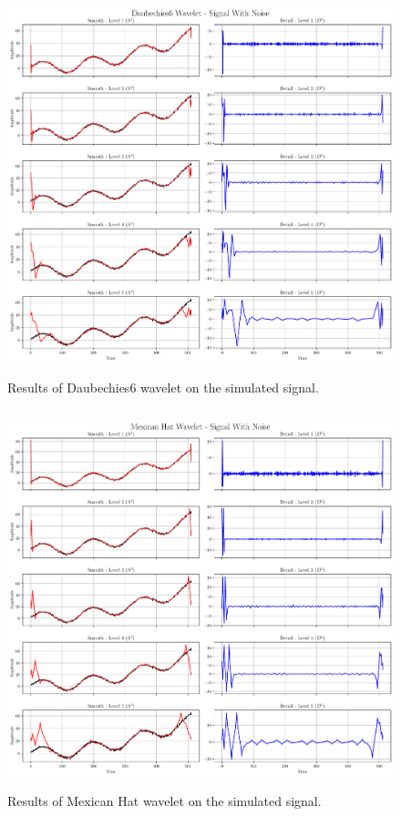 \documentclass[12pt]{article}
\begin{document}
	\begin{figure}[!h]
		\centering
		\includegraphics[height=11cm]{../Tests/Outputs/Daubechies6Wavelet_SignalWithNoise.pdf}
		\caption{Results of Daubechies6 wavelet on the simulated signal.}
		\label{fig:1d_db6}
	\end{figure}
	
	\begin{figure}[!h]
		\centering
		\includegraphics[height=11cm]{../Tests/Outputs/MexicanHatWavelet_SignalWithNoise.pdf}
		\caption{Results of Mexican Hat wavelet on the simulated signal.}
		\label{fig:1d_mh}
	\end{figure}	
	
\end{document}
